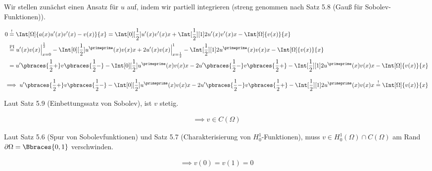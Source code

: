 \begin{solution}

Wir stellen zunächst einen Ansatz für $u$ auf, indem wir partiell integrieren (streng genommen nach Satz 5.8 (Gauß für Sobolev-Funktionen)).

\begin{align*}
  0
  & \stackrel{!}{=}
  \Int[\Omega]{a(x) u^\prime(x) v^\prime(x) - v(x)}{x}
  =
  \Int[0][\frac{1}{2}]{u^\prime(x) v^\prime(x)}{x}
  +
  \Int[\frac{1}{2}][1]{2 u^\prime(x) v^\prime(x)}{x}
  -
  \Int[\Omega]{v(x)}{x} \\
  & \stackrel
  {
    \mathrm{PI}
  }{=}
  u^\prime(x) v(x) \Big |_{x=0}^{\frac{1}{2}}
  -
  \Int[0][\frac{1}{2}]{u^\primeprime(x) v(x)}{x}
  +
  2 u^\prime(x) v(x) \Big |_{x=\frac{1}{2}}^1
  -
  \Int[\frac{1}{2}][1]{2 u^\primeprime(x) v(x)}{x}
  -
  \Int[\Omega]{v(x)}{x} \\
  & =
  u^\prime \pbraces{\frac{1}{2} +} v\pbraces{\frac{1}{2} -}
  -
  \Int[0][\frac{1}{2}]{u^\primeprime(x) v(x)}{x}
  -
  2 u^\prime \pbraces{\frac{1}{2} -} v\pbraces{\frac{1}{2} +}
  -
  \Int[\frac{1}{2}][1]{2 u^\primeprime(x) v(x)}{x}
  -
  \Int[\Omega]{v(x)}{x}
\end{align*}

\begin{align*}
  \implies
  u^\prime \pbraces{\frac{1}{2} +} v\pbraces{\frac{1}{2} -}
  -
  \Int[0][\frac{1}{2}]{u^\primeprime(x) v(x)}{x}
  -
  2 u^\prime \pbraces{\frac{1}{2} -} v\pbraces{\frac{1}{2} +}
  -
  \Int[\frac{1}{2}][1]{2 u^\primeprime(x) v(x)}{x}
  \stackrel{!}{=}
  \Int[\Omega]{v(x)}{x}
\end{align*}

Laut Satz 5.9 (Einbettungssatz von Sobolev), ist $v$ stetig.

\begin{align*}
  \implies
  v \in C(\Omega)
\end{align*}


Laut Satz 5.6 (Spur von Sobolevfunktionen) und Satz 5.7 (Charakterisierung von $H_0^1$-Funktionen), muss $v \in H_0^1(\Omega) \cap C(\Omega)$ am Rand $\partial \Omega = \Bbraces{0, 1}$ verschwinden.

\begin{align*}
  \implies
  v(0) = v(1) = 0
\end{align*}



\end{solution}

